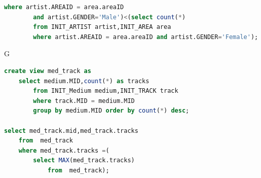 \documentclass[11pt]{article} %
\begin{document}
{\begin{lstlisting}[language=SQL, keywordstyle=\color{blue!70},
commentstyle=\color{red!50!green!50!blue!50},
rulesepcolor=\color{red!20!green!20!blue!20},
frame=shadowbox]
		where artist.AREAID = area.areaID
		and artist.GENDER='Male')<(select count(*)
		from INIT_ARTIST artist,INIT_AREA area
		where artist.AREAID = area.areaID and artist.GENDER='Female');
\end{lstlisting}
G
\begin{lstlisting}[language=SQL, keywordstyle=\color{blue!70},
commentstyle=\color{red!50!green!50!blue!50},
rulesepcolor=\color{red!20!green!20!blue!20},
frame=shadowbox]
create view med_track as
	select medium.MID,count(*) as tracks
		from INIT_Medium medium,INIT_TRACK track
		where track.MID = medium.MID
		group by medium.MID order by count(*) desc;

select med_track.mid,med_track.tracks
	from  med_track 
	where med_track.tracks =(
  		select MAX(med_track.tracks)
  			from  med_track);
\end{lstlisting}


}
\end{document}
